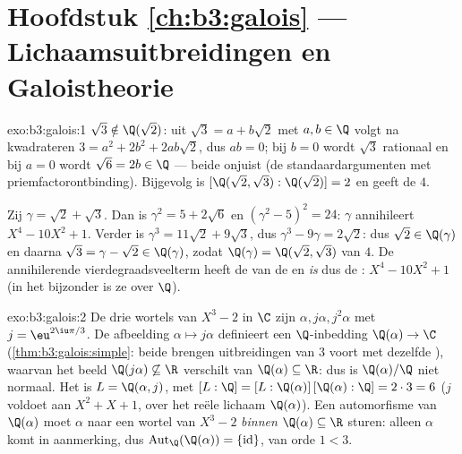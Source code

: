 \section*{Hoofdstuk \ref{ch:b3:galois} --- Lichaamsuitbreidingen en
Galoistheorie}

\begin{solution}{exo:b3:galois:1}
$\sqrt3 \notin \Q(\sqrt2)$: uit $\sqrt3 = a + b\sqrt2$ met $a, b
\in \Q$ volgt na kwadrateren $3 = a^2 + 2b^2 + 2ab\sqrt2$, dus $ab
= 0$; bij $b = 0$ wordt $\sqrt3$ rationaal en bij $a = 0$ wordt
$\sqrt6 = 2b \in \Q$ --- beide onjuist (de standaardargumenten met
priemfactorontbinding). Bijgevolg is $[\Q(\sqrt2,\sqrt3) :
\Q(\sqrt2)] = 2$ en geeft de   $4$.

Zij $\gamma = \sqrt2 + \sqrt3$. Dan is $\gamma^2 = 5 + 2\sqrt6$ en
$(\gamma^2 - 5)^2 = 24$: $\gamma$ annihileert $X^4 - 10X^2 + 1$.
Verder is $\gamma^3 = 11\sqrt2 + 9\sqrt3$, dus $\gamma^3 - 9\gamma
= 2\sqrt2$: dus $\sqrt2 \in \Q(\gamma)$ en daarna $\sqrt3 = \gamma
- \sqrt2 \in \Q(\gamma)$, zodat $\Q(\gamma) = \Q(\sqrt2,\sqrt3)$
van  $4$. De annihilerende vierdegraadsveelterm heeft de
 van de  en \emph{is} dus de
: $X^4 - 10X^2 + 1$ (in het bijzonder is ze
 over $\Q$).
\end{solution}

\begin{solution}{exo:b3:galois:2}
De drie wortels van $X^3 - 2$ in $\C$ zijn $\alpha, j\alpha,
j^2\alpha$ met $j = \eu^{2\iu\pi/3}$. De afbeelding $\alpha
\mapsto j\alpha$ definieert een $\Q$-inbedding $\Q(\alpha) \to \C$
(\cref{thm:b3:galois:simple}: beide brengen uitbreidingen van
 $3$ voort met dezelfde ), waarvan het beeld
$\Q(j\alpha) \not\subseteq \R$ verschilt van $\Q(\alpha) \subseteq
\R$: dus is $\Q(\alpha)/\Q$ niet normaal. Het  is
$L = \Q(\alpha, j)$, met $[L:\Q] =
[L:\Q(\alpha)]\,[\Q(\alpha):\Q] = 2 \cdot 3 = 6$ ($j$ voldoet aan
$X^2 + X + 1$,  over het reële lichaam $\Q(\alpha)$).
Een automorfisme van $\Q(\alpha)$ moet $\alpha$ naar een wortel
van $X^3 - 2$ \emph{binnen} $\Q(\alpha) \subseteq \R$ sturen:
alleen $\alpha$ komt in aanmerking, dus
$\operatorname{Aut}_\Q(\Q(\alpha)) = \{\mathrm{id}\}$, van orde $1
< 3$.
\end{solution}

